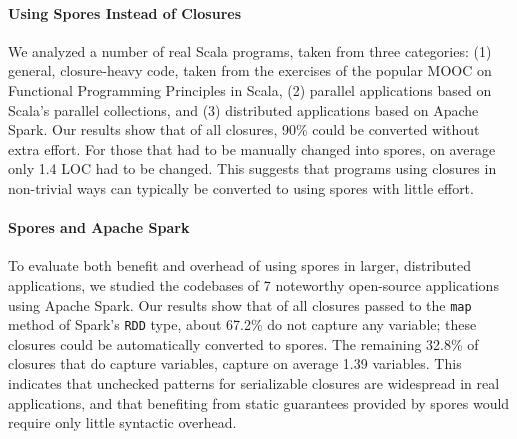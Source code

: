 \documentclass[english]{lni}
\begin{document}
\vspace{-5mm}
\paragraph{Using Spores Instead of Closures}
We analyzed a number of real Scala programs, taken from three categories: (1)
general, closure-heavy code, taken from the exercises of the popular MOOC on
Functional Programming Principles in Scala, (2) parallel applications based on Scala's parallel
collections, and (3) distributed applications based on Apache Spark. Our
results show that of all closures, 90\% could be converted without extra
effort. For those that had to be manually changed into spores, on average only 1.4 LOC
had to be changed. This suggests that programs using closures in non-trivial
ways can typically be converted to using spores with little effort.

\vspace{-5mm}
\paragraph{Spores and Apache Spark}
To evaluate both benefit and overhead of using spores in larger, distributed
applications, we studied the codebases of 7 noteworthy open-source
applications using Apache Spark. Our results show that of all closures
passed to the \verb|map| method of Spark's \verb|RDD| type, about 67.2\% do not capture any
variable; these closures could be automatically converted to spores. The
remaining 32.8\% of closures that do capture variables, capture on average
1.39 variables. This indicates that unchecked patterns for serializable
closures are widespread in real applications, and that benefiting from static
guarantees provided by spores would require only little syntactic overhead.

% 
\end{document}
